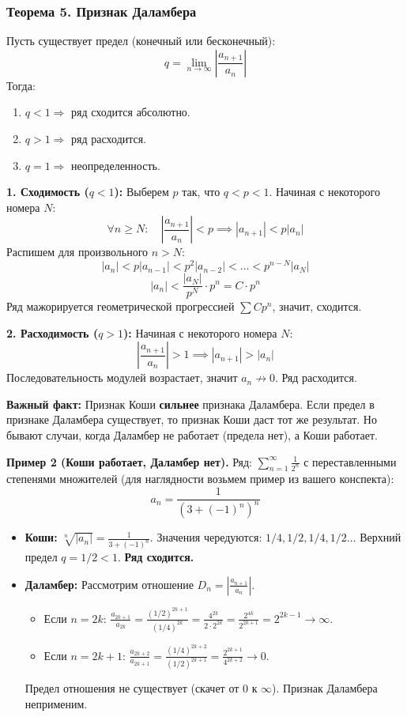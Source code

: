 \subsubsection{Теорема 5. Признак Даламбера}
Пусть существует предел (конечный или бесконечный):
\[ q = \lim_{n\to\infty} \left| \frac{a_{n+1}}{a_n} \right| \]
Тогда:
\begin{enumerate}
    \item $q < 1 \Rightarrow$ ряд сходится абсолютно.
    \item $q > 1 \Rightarrow$ ряд расходится.
    \item $q = 1 \Rightarrow$ неопределенность.
\end{enumerate}

\begin{tcolorbox}[title=Доказательство]
    \textbf{1. Сходимость ($q < 1$):}
    Выберем $p$ так, что $q < p < 1$.
    Начиная с некоторого номера $N$:
    \[ \forall n \ge N: \quad \left| \frac{a_{n+1}}{a_n} \right| < p \implies |a_{n+1}| < p |a_n| \]
    Распишем для произвольного $n > N$:
    \[ |a_n| < p |a_{n-1}| < p^2 |a_{n-2}| < \dots < p^{n-N} |a_N| \]
    \[ |a_n| < \frac{|a_N|}{p^N} \cdot p^n = C \cdot p^n \]
    Ряд мажорируется геометрической прогрессией $\sum C p^n$, значит, сходится.

    \textbf{2. Расходимость ($q > 1$):}
    Начиная с некоторого номера $N$:
    \[ \left| \frac{a_{n+1}}{a_n} \right| > 1 \implies |a_{n+1}| > |a_n| \]
    Последовательность модулей возрастает, значит $a_n \not\to 0$. Ряд расходится.
\end{tcolorbox}

\textbf{Важный факт:} Признак Коши \textbf{сильнее} признака Даламбера.
Если предел в признаке Даламбера существует, то признак Коши даст тот же результат. Но бывают случаи, когда Даламбер не работает (предела нет), а Коши работает.

\textbf{Пример 2 (Коши работает, Даламбер нет).}
Ряд: $\sum_{n=1}^{\infty} \frac{1}{2^n}$ с переставленными степенями множителей (для наглядности возьмем пример из вашего конспекта):
\[ a_n = \frac{1}{(3+(-1)^n)^n} \]
\begin{itemize}
    \item \textbf{Коши:}
    $\sqrt[n]{|a_n|} = \frac{1}{3+(-1)^n}$. Значения чередуются: $1/4, 1/2, 1/4, 1/2 \dots$
    Верхний предел $q = 1/2 < 1$. \textbf{Ряд сходится.}
    
    \item \textbf{Даламбер:}
    Рассмотрим отношение $D_n = \left| \frac{a_{n+1}}{a_n} \right|$.
    \begin{itemize}
        \item Если $n=2k$: $\frac{a_{2k+1}}{a_{2k}} = \frac{(1/2)^{2k+1}}{(1/4)^{2k}} = \frac{4^{2k}}{2 \cdot 2^{2k}} = \frac{2^{4k}}{2^{2k+1}} = 2^{2k-1} \to \infty$.
        \item Если $n=2k+1$: $\frac{a_{2k+2}}{a_{2k+1}} = \frac{(1/4)^{2k+2}}{(1/2)^{2k+1}} = \frac{2^{2k+1}}{4^{2k+2}} \to 0$.
    \end{itemize}
    Предел отношения не существует (скачет от 0 к $\infty$). Признак Даламбера неприменим.
\end{itemize}

